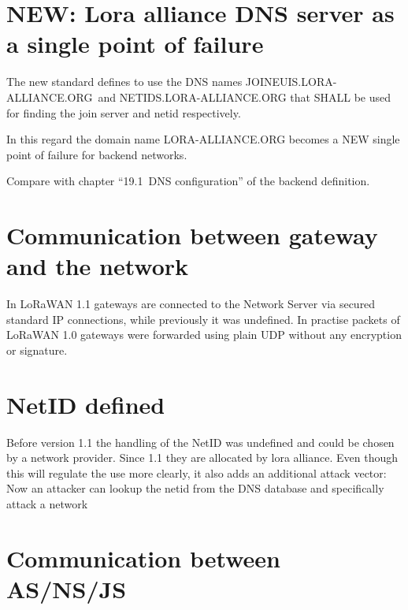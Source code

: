{\hypertarget{h.mdrkurwqvvj8}{\section{\texorpdfstring{{NEW: Lora
alliance DNS server as a single point of
failure}}{NEW: Lora alliance DNS server as a single point of failure}}\label{h.mdrkurwqvvj8}}

{The new standard defines to use the DNS names
}{JOINEUIS.LORA-ALLIANCE.ORG}{~and }{NETIDS.LORA-ALLIANCE.ORG }{that
SHALL be used for finding the join server and netid respectively.}

{In this regard the domain name }{LORA-ALLIANCE.ORG }{becomes a }{NEW
single point of failure }{for backend networks.}

{Compare with chapter ``19.1}{~DNS configuration'' of the backend
definition.}

\hypertarget{h.mn1ux3159m0}{\section{\texorpdfstring{{Communication
between gateway and the
network}}{Communication between gateway and the network}}\label{h.mn1ux3159m0}}

{In LoRaWAN 1.1 gateways are connected to the Network Server via secured
standard IP connections, while previously it was undefined. In practise
packets of LoRaWAN 1.0 gateways were forwarded using plain UDP without
any encryption or signature.}

\hypertarget{h.jom2i6adwnnm}{\section{\texorpdfstring{{NetID
defined}}{NetID defined}}\label{h.jom2i6adwnnm}}

{Before version 1.1 the handling of the NetID was undefined and could be
chosen by a network provider. Since 1.1 they are allocated by lora
alliance. Even though this will regulate the use more clearly, it also
adds an additional attack vector: Now an attacker can lookup the netid
from the DNS database and specifically attack a network}

\hypertarget{h.rext4wcd7qnn}{\section{\texorpdfstring{{Communication
between
AS/NS/JS}}{Communication between AS/NS/JS}}\label{h.rext4wcd7qnn}}

}
